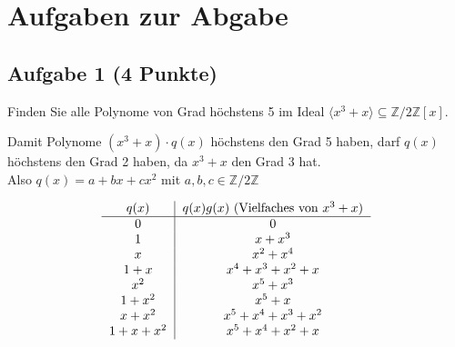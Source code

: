 \documentclass{article} %
\begin{document}
\section*{Aufgaben zur Abgabe}
\subsection*{Aufgabe 1 (4 Punkte)}  
Finden Sie alle Polynome von Grad höchstens 5 im Ideal  
$\langle x^3 + x \rangle \subseteq \mathbb{Z}/2\mathbb{Z}[x]$.
\begin{mybox}
Damit Polynome $(x^3 + x) \cdot q(x)$ höchstens den Grad 5 haben, darf $q(x)$ höchstens den Grad 2 haben, da $x^3 + x$ den Grad 3 hat. \\
Also $q(x)=a+bx+cx^2$ mit $a, b, c \in \mathbb{Z}/2\mathbb{Z}$
\begin{table}[H]
    \centering
    \[
    \begin{tabular}{c|c}
        $q(x)$ & $q(x)g(x)$  (Vielfaches von $x^3 + x)$   \\ \hline
        $0$ & $0$\\
        $1$ & $x+x^3$  \\
        $x$ & $x^2+x^4$  \\
        $1+x$ & $x^4 + x^3 + x^2 + x$ \\
        $x^2$ & $x^5 + x^3$  \\
        $1+x^2$ & $x^5  + x $ \\
        $x+x^2$ & $x^5 + x^4 + x^3 + x^2$ \\
        $1+x+x^2$ & $x^5 + x^4  + x^2 + x$  
    \end{tabular}
    \]
\end{table}
\end{mybox}
\end{document}
